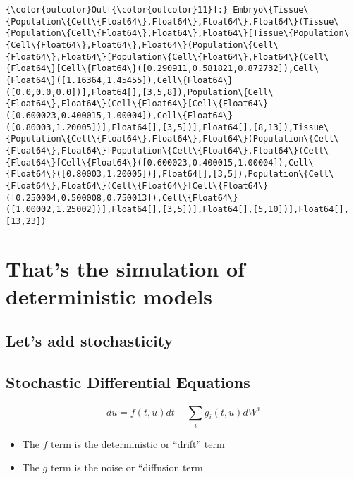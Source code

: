 \documentclass[11pt]{article}
\begin{document}
            \begin{Verbatim}[commandchars=\\\{\}]
{\color{outcolor}Out[{\color{outcolor}11}]:} Embryo\{Tissue\{Population\{Cell\{Float64\},Float64\},Float64\},Float64\}(Tissue\{Population\{Cell\{Float64\},Float64\},Float64\}[Tissue\{Population\{Cell\{Float64\},Float64\},Float64\}(Population\{Cell\{Float64\},Float64\}[Population\{Cell\{Float64\},Float64\}(Cell\{Float64\}[Cell\{Float64\}([0.290911,0.581821,0.872732]),Cell\{Float64\}([1.16364,1.45455]),Cell\{Float64\}([0.0,0.0,0.0])],Float64[],[3,5,8]),Population\{Cell\{Float64\},Float64\}(Cell\{Float64\}[Cell\{Float64\}([0.600023,0.400015,1.00004]),Cell\{Float64\}([0.80003,1.20005])],Float64[],[3,5])],Float64[],[8,13]),Tissue\{Population\{Cell\{Float64\},Float64\},Float64\}(Population\{Cell\{Float64\},Float64\}[Population\{Cell\{Float64\},Float64\}(Cell\{Float64\}[Cell\{Float64\}([0.600023,0.400015,1.00004]),Cell\{Float64\}([0.80003,1.20005])],Float64[],[3,5]),Population\{Cell\{Float64\},Float64\}(Cell\{Float64\}[Cell\{Float64\}([0.250004,0.500008,0.750013]),Cell\{Float64\}([1.00002,1.25002])],Float64[],[3,5])],Float64[],[5,10])],Float64[],[13,23])
\end{Verbatim}
        
    \section{That's the simulation of deterministic
models}\label{thats-the-simulation-of-deterministic-models}

\subsection{Let's add stochasticity}\label{lets-add-stochasticity}

    \subsection{Stochastic Differential
Equations}\label{stochastic-differential-equations}

\[ du = f(t,u)dt + \sum_i g_i(t,u)dW^i \]

\begin{itemize}
\itemsep1pt\parskip0pt
\item
  The $f$ term is the deterministic or ``drift'' term
\item
  The $g$ term is the noise or ``diffusion term
\end{itemize}
\end{document}
